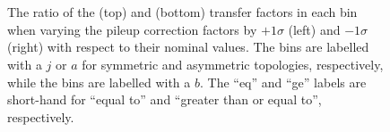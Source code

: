 \begin{figure}[h!]
~
\\
~
\\
\caption{The ratio of the \Tmutottw (top) and \Tmumutoz (bottom) transfer 
factors in each \njnbht bin when varying the pileup correction factors by 
$+1\sigma$ (left) and $-1\sigma$ (right) with respect to their nominal values. 
The \njet bins are labelled with a $j$ or $a$ for symmetric and asymmetric 
topologies, respectively, while the \nb bins are labelled with a $b$. The 
``eq'' and ``ge'' labels are short-hand for ``equal to'' and ``greater than or 
equal to'', respectively.}
\label{fig:tfvariations}
\end{figure}

